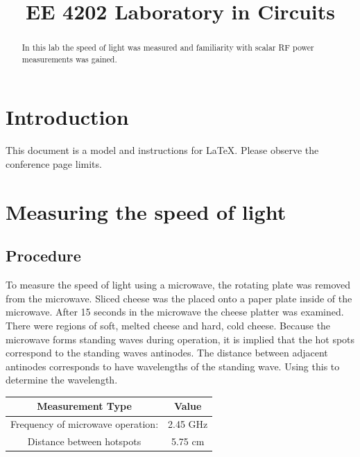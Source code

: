 \documentclass[conference]{IEEEtran}
\begin{document}
\title{EE 4202 Laboratory in Circuits}

\author{}
\maketitle

\begin{abstract}
    In this lab the speed of light was measured and familiarity with scalar RF power measurements was gained.
\end{abstract}

\section{Introduction}
This document is a model and instructions for \LaTeX.
Please observe the conference page limits. 

\section{Measuring the speed of light}

\subsection{Procedure}

To measure the speed of light using a microwave, the rotating plate was removed
from the microwave. Sliced cheese was the placed onto a paper plate inside of
the microwave. After 15 seconds in the microwave the cheese platter was
examined. There were regions of soft, melted cheese and hard, cold cheese.
Because the microwave forms standing waves during operation, it is implied that
the hot spots correspond to the standing waves antinodes. The distance between
adjacent antinodes corresponds to have wavelengths of the standing wave. Using
this to determine the wavelength.

\begin{table}[htbp]
    \begin{center}
        \begin{tabular}{|c|c|}
            \hline
            \textbf{Measurement Type}         & \textbf{Value} \\ \hline
            Frequency of microwave operation: & 2.45 GHz       \\ \hline
            Distance between hotspots         & 5.75 cm        \\ \hline
        \end{tabular}
    \end{center}
\end{table}
\end{document}
